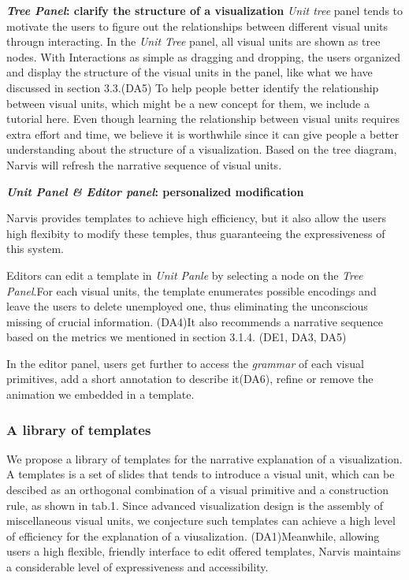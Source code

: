 \textbf{\textit{Tree Panel}: clarify the structure of a visualization}
\textit{Unit tree} panel tends to motivate the users to figure out the relationships between different visual units througn interacting.  
In the \textit{Unit Tree} panel, all visual units are shown as tree nodes.
With Interactions as simple as dragging and dropping, the users organized and display the structure of the visual units in the panel, like what we have discussed in section 3.3.(DA5) To help people better identify the relationship between visual units, which might be a new concept for them, we include a tutorial here. Even though learning the relationship between visual units requires extra effort and time, we believe it is worthwhile since it can give people a better understanding about the structure of a visualization. Based on the tree diagram, Narvis will refresh the narrative sequence of visual units. 

 \textbf{\textit{ Unit Panel \& Editor panel}: personalized modification}
 
 Narvis provides templates to achieve high efficiency, but it also allow the users high flexibity to modify these temples, thus guaranteeing the expressiveness of this system. 
 
Editors can edit a template in \textit{Unit Panle} by selecting a node on the \textit{Tree Panel}.For each visual units, the template enumerates possible encodings and leave the users to delete unemployed one, thus eliminating the unconscious missing of crucial information. (DA4)It also recommends a narrative sequence based on the metrics we mentioned in section 3.1.4. (DE1, DA3, DA5) 
 
In the editor panel, users get further to access the \textit{grammar} of each visual primitives, add a short annotation to describe it(DA6), refine or remove the animation we embedded in a template. 

\subsubsection{A library of templates}
We propose a library of templates for the narrative explanation of a visualization. A templates is a set of slides that tends to introduce a visual unit, which can be descibed as an orthogonal combination of a visual primitive and a construction rule, as shown in tab.1. Since advanced visualization design is the assembly of miscellaneous visual units, we conjecture such templates can achieve a high level of efficiency for the explanation of a viusalization. (DA1)Meanwhile, allowing users a high flexible, friendly interface to edit offered templates, Narvis maintains a considerable level of expressiveness and accessibility. 

